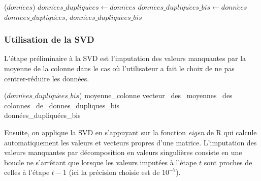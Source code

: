 \documentclass[12pt, openany, fleqn, french]{article}
\begin{document}
\begin{algorithm}[H]
\footnotesize
{} {($donn\acute{e}es$)}
    \State $donn\acute{e}es\_dupliqu\acute{e}es \gets donn\acute{e}es$
    \State $donn\acute{e}es\_dupliqu\acute{e}es\_bis \gets donn\acute{e}es$
    \State \Return $donn\acute{e}es\_dupliqu\acute{e}es$, $donn\acute{e}es\_dupliqu\acute{e}es\_bis$\\
    \EndFunction
\end{algorithm}

\subsubsection{Utilisation de la SVD}
    \vspace{0,5cm}
    L'étape préliminaire à la SVD est l'imputation des valeurs manquantes par la moyenne de la colonne dans le cas où l'utilisateur a fait le choix de ne pas centrer-réduire les données.
    \vspace{0,5cm}

\begin{algorithm}[H]
\footnotesize
     {($donn\acute{e}es\_dupliqu\acute{e}es\_bis$)}
    \State moyenne\_colonne \gets vecteur \, des \, moyennes \, des \, colonnes \, de \, donnes\_dupliques\_bis \\
    \State {}
    \State \Return données\_dupliquées\_bis\\
    \EndFunction
\end{algorithm}

    \vspace{0,5cm}
    Ensuite, on applique la SVD en s'appuyant sur la fonction \textit{eigen} de R qui calcule automatiquement les valeurs et vecteurs propres d'une matrice. L'imputation des valeurs manquantes par décomposition en valeurs singulières consiste en une boucle ne s'arrêtant que lorsque les valeurs imputées à l'étape $t$ sont proches de celles à l'étape $t-1$ (ici la précision choisie est de $10^{-7}$).
    \vspace{0,5cm}
\end{document}
